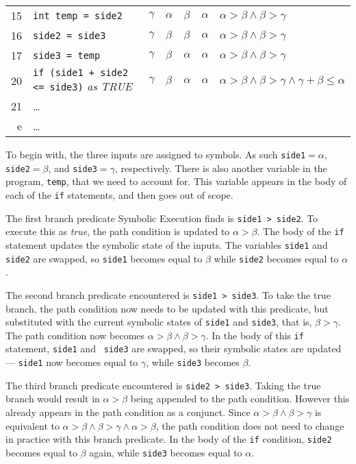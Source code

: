\begin{center}
{\begin{tabular}{rllllll}
15          & {\tt int temp = side2}                           & $\gamma$    & $\alpha$    & $\beta$     & $\alpha$   & $\alpha > \beta \wedge \beta > \gamma$ \\
16          & {\tt side2 = side3}                              & $\gamma$    & $\beta$     & $\beta$     & $\alpha$   & $\alpha > \beta \wedge \beta > \gamma$ \\
17          & {\tt side3 = temp}                               & $\gamma$    & $\beta$     & $\alpha$    & $\alpha$   & $\alpha > \beta \wedge \beta > \gamma$ \\
20          & {\tt if (side1 + side2 <= side3)} {\it as TRUE}  & $\gamma$    & $\beta$     & $\alpha$    & $\alpha$   & $\alpha > \beta \wedge \beta > \gamma \wedge \gamma + \beta \leq \alpha$ \\
21          & \dots \\
e           & \dots \\
\bottomrule
\end{tabular}}
\end{center}

To begin with, the three inputs are assigned to symbols. As such {\tt side1}$ =
\alpha$, {\tt side2}$ = \beta$, and {\tt side3}$ = \gamma$, respectively. There
is also another variable in the program, {\tt temp}, that we need to account
for. This variable appears in the body of each of the {\tt if} statements, and
then goes out of scope. 

The first branch predicate Symbolic Execution finds is {\tt side1 > side2}. To
execute this as {\it true}, the path condition is updated to $\alpha > \beta$.
The body of the {\tt if} statement updates the symbolic state of the inputs. The
variables {\tt side1} and {\tt side2} are swapped, so {\tt side1} becomes equal
to $\beta$ while {\tt side2} becomes equal to $\alpha$. 

The second branch predicate encountered is {\tt side1 > side3}. To take the true
branch, the path condition now needs to be updated with this predicate, but
substituted with the current symbolic states of {\tt side1} and {\tt side3},
that is, $\beta > \gamma$. The path condition now becomes $\alpha > \beta \wedge
\beta > \gamma$. In the body of this {\tt if} statement, {\tt side1} and {\tt
side3} are swapped, so their symbolic states are updated --- {\tt side1} now
becomes equal to $\gamma$, while {\tt side3} becomes $\beta$.

The third branch predicate encountered is {\tt side2 > side3}. Taking the true
branch would result in $\alpha > \beta$ being appended to the path condition.
However this already appears in the path condition as a conjunct. Since $\alpha
> \beta \wedge \beta > \gamma$ is equivalent to $\alpha > \beta \wedge \beta >
\gamma \wedge \alpha > \beta$, the path condition does not need to change in
practice with this branch predicate.
%
In the body of the {\tt if} condition, {\tt side2} becomes equal to $\beta$
again, while {\tt side3} becomes equal to $\alpha$.

